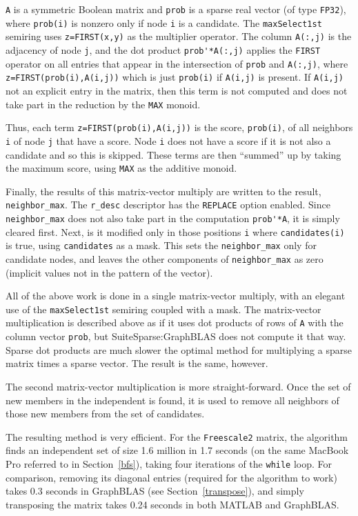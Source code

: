 \documentclass[12pt]{article}
\begin{document}
\verb'A' is a symmetric Boolean matrix and \verb'prob' is a sparse real vector
(of type \verb'FP32'), where \verb'prob(i)' is nonzero only if node \verb'i' is
a candidate.  The \verb'maxSelect1st' semiring uses \verb'z=FIRST(x,y)' as the
multiplier operator.  The column \verb'A(:,j)' is the adjacency of node
\verb'j', and the dot product \verb"prob'*A(:,j)" applies the \verb'FIRST'
operator on all entries that appear in the intersection of \verb'prob' and
\verb'A(:,j)', where \verb'z=FIRST(prob(i),A(i,j))' which is just
\verb'prob(i)' if \verb'A(i,j)' is present.  If \verb'A(i,j)' not an explicit
entry in the matrix, then this term is not computed and does not take part in
the reduction by the \verb'MAX' monoid.

Thus, each term \verb'z=FIRST(prob(i),A(i,j))' is the score, \verb'prob(i)',
of all neighbors \verb'i' of node \verb'j' that have a score.  Node \verb'i'
does not have a score if it is not also a candidate and so this is skipped.
These terms are then ``summed'' up by taking the maximum score, using
\verb'MAX' as the additive monoid.

Finally, the results of this matrix-vector multiply are written to the result,
\verb'neighbor_max'.  The \verb'r_desc' descriptor has the \verb'REPLACE'
option enabled.  Since \verb'neighbor_max' does not also take part in the
computation \verb"prob'*A", it is simply cleared first.  Next, is it modified
only in those positions \verb'i' where \verb'candidates(i)' is true, using
\verb'candidates' as a mask.  This sets the \verb'neighbor_max' only for
candidate nodes, and leaves the other components of \verb'neighbor_max' as zero
(implicit values not in the pattern of the vector).

All of the above work is done in a single matrix-vector multiply, with an
elegant use of the \verb'maxSelect1st' semiring coupled with a mask.  The
matrix-vector multiplication is described above as if it uses dot products of
rows of \verb'A' with the column vector \verb'prob', but SuiteSparse:GraphBLAS
does not compute it that way.  Sparse dot products are much slower the optimal
method for multiplying a sparse matrix times a sparse vector.  The result is
the same, however.

The second matrix-vector multiplication is more straight-forward.  Once the set
of new members in the independent is found, it is used to remove all neighbors
of those new members from the set of candidates.

The resulting method is very efficient.  For the \verb'Freescale2' matrix, the
algorithm finds an independent set of size 1.6 million in 1.7 seconds (on the
same MacBook Pro referred to in Section~\ref{bfs}), taking four iterations of
the \verb'while' loop.  For comparison, removing its diagonal entries (required
for the algorithm to work) takes 0.3 seconds in GraphBLAS (see
Section~\ref{transpose}), and simply transposing the matrix takes 0.24 seconds
in both MATLAB and GraphBLAS.
\end{document}
